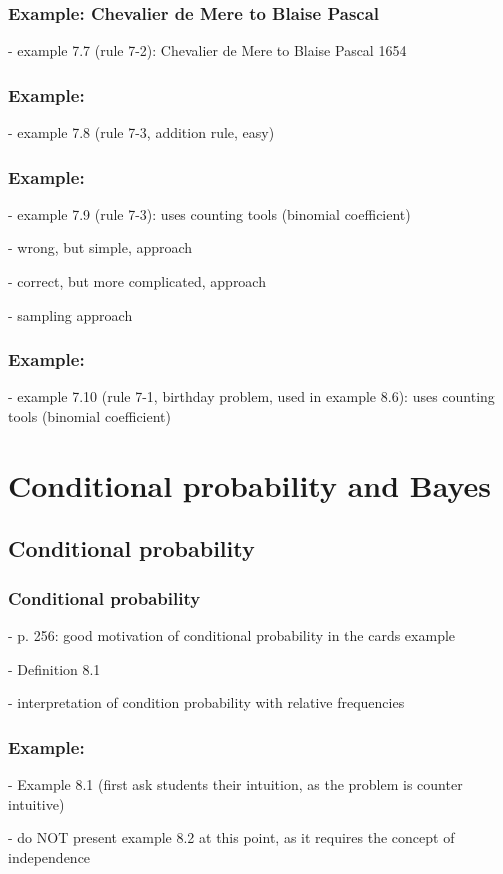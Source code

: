\begin{frame}
    \frametitle{Example: Chevalier de Mere to Blaise Pascal}

    - example 7.7 (rule 7-2): Chevalier de Mere to Blaise Pascal 1654

\end{frame}

\begin{frame}
    \frametitle{Example:}

    - example 7.8 (rule 7-3, addition rule, easy)

\end{frame}

\begin{frame}
    \frametitle{Example:}

    - example 7.9 (rule 7-3): uses counting tools (binomial coefficient)

        - wrong, but simple, approach

        - correct, but more complicated, approach

        - sampling approach

\end{frame}

\begin{frame}
    \frametitle{Example:}

    - example 7.10 (rule 7-1, birthday problem, used in example 8.6): uses counting tools (binomial coefficient)

\end{frame}

\section{Conditional probability and Bayes}

\subsection{Conditional probability}

\begin{frame}
    \frametitle{Conditional probability}

- p. 256: good motivation of conditional probability in the cards example

- Definition 8.1

- interpretation of condition probability with relative frequencies

\end{frame}

\begin{frame}
    \frametitle{Example:}

- Example 8.1 (first ask students their intuition, as the problem is counter intuitive)

- do NOT present example 8.2 at this point, as it requires the concept of independence

\end{frame}


